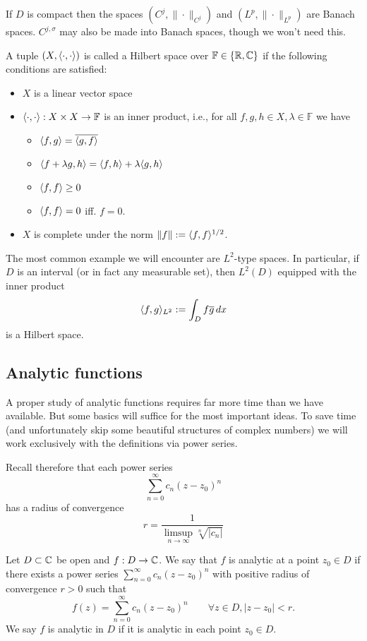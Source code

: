If $D$ is compact then the spaces $(C^j, \|\cdot\|_{C^j})$ and
$(L^p, \|\cdot\|_{L^p})$ are Banach spaces. $C^{j,\sigma}$ may also be made
into Banach spaces, though we won't need this.

A tuple $(X, \langle\cdot, \cdot\rangle)$ is called a Hilbert space over $\mathbb{F} \in
\{\mathbb{R}, \mathbb{C}\}$ if the following conditions are satisfied:
\begin{itemize}
  \item $X$ is a linear vector space
  \item $\langle\cdot, \cdot\rangle : X \times X \to \mathbb{F}$ is an inner product, i.e.,
  for all $f, g, h \in X, \lambda \in \mathbb{F}$ we have
  \begin{itemize}
      \item $\langle f, g\rangle = \overline{\langle g, f\rangle}$
      \item $\langle f + \lambda g, h \rangle = \langle f, h \rangle + \lambda \langle g, h \rangle$
      \item $\langle f, f \rangle \geq 0$
      \item $\langle f,f \rangle = 0$ iff. $f = 0$.
  \end{itemize}
  \item $X$ is complete under the norm $\|f\| := \langle f,f\rangle^{1/2}$.
\end{itemize}

The most common example we will encounter are $L^2$-type spaces. In particular,
if $D$ is an interval (or in fact any measurable set), then $L^2(D)$ equipped
with the inner product
\[
  \langle f, g \rangle_{L^2} := \int_D f \overline{g} \,dx
\]
is a Hilbert space.



\subsection{Analytic functions}
%
A proper study of analytic functions requires far more time than we have
available. But some basics will suffice for the most important ideas.
To save time (and unfortunately skip some beautiful structures of
complex numbers) we will work exclusively with the definitions via power
series.

Recall therefore that each power series
\[
    \sum_{n = 0}^\infty c_n (z - z_0)^n
\]
has a radius of convergence
\[
    r = \frac{1}{\limsup_{n \to \infty} \sqrt[n]{|c_n|}}
\]

\begin{definition}
  Let $D \subset \mathbb{C}$ be open and $f : D \to \mathbb{C}$. We say that $f$ is
  analytic at a point $z_0 \in D$ if there exists a power series
  $\sum_{n = 0}^\infty c_n (z - z_0)^n$ with  positive radius
  of convergence $r > 0$ such that
  \[
    f(z) = \sum_{n = 0}^\infty c_n (z - z_0)^n \qquad \forall
    z \in D, |z - z_0| < r.
  \]
  We say $f$ is analytic in $D$ if it is analytic in each point
  $z_0 \in D$.
\end{definition}

